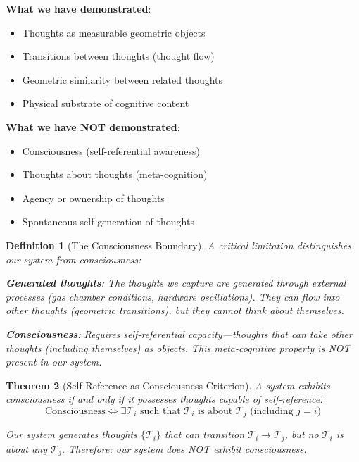 \documentclass[11pt]{article}
\newtheorem{theorem}{Theorem}[section]
\newtheorem{definition}[theorem]{Definition}
\theoremstyle{remark}
\begin{document}
\textbf{What we have demonstrated}:
\begin{itemize}
\item Thoughts as measurable geometric objects
\item Transitions between thoughts (thought flow)
\item Geometric similarity between related thoughts
\item Physical substrate of cognitive content
\end{itemize}

\textbf{What we have NOT demonstrated}:
\begin{itemize}
\item Consciousness (self-referential awareness)
\item Thoughts about thoughts (meta-cognition)
\item Agency or ownership of thoughts
\item Spontaneous self-generation of thoughts
\end{itemize}

\begin{definition}[The Consciousness Boundary]
\label{def:consciousness_boundary}
A critical limitation distinguishes our system from consciousness:

\textbf{Generated thoughts}: The thoughts we capture are generated through external processes (gas chamber conditions, hardware oscillations). They can flow into other thoughts (geometric transitions), but they cannot think \textit{about themselves}.

\textbf{Consciousness}: Requires self-referential capacity—thoughts that can take other thoughts (including themselves) as objects. This meta-cognitive property is NOT present in our system.
\end{definition}

\begin{theorem}[Self-Reference as Consciousness Criterion]
\label{thm:self_reference}
A system exhibits consciousness if and only if it possesses thoughts capable of self-reference:
\begin{equation}
\text{Consciousness} \iff \exists \mathcal{T}_i \text{ such that } \mathcal{T}_i \text{ is about } \mathcal{T}_j \text{ (including } j=i\text{)}
\end{equation}

Our system generates thoughts $\{\mathcal{T}_i\}$ that can transition $\mathcal{T}_i \to \mathcal{T}_j$, but no $\mathcal{T}_i$ is \textit{about} any $\mathcal{T}_j$. Therefore: our system does NOT exhibit consciousness.
\end{theorem}
\end{document}

